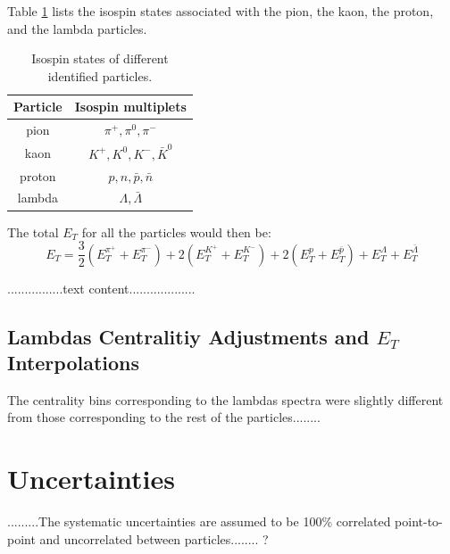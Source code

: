Table \ref{table:isospinStates} lists the isospin states associated with the pion, the kaon, the proton, and the lambda particles.
	\begin{table}[h!]
	\centering
	\begin{tabular}{|c c|}
	\hline
	Particle & Isospin multiplets \\ [0.5ex]
	\hline
	\hline
	pion & $\pi^{+}, \pi^{0}, \pi^{-} $ \\
	kaon & $K^{+}, K^{0}, K^{-}, \bar{K}^{0}$ \\
	proton & $p, n, \bar{p}, \bar{n}$  \\
	lambda & $\Lambda, \bar{\Lambda}$  \\ [1ex]
	\hline
	\end{tabular}
	\caption{Isospin states of different identified particles.}
	\label{table:isospinStates}
	\end{table}
The total $E_{T}$ for all the particles would then be:	
	\begin{equation}\label{eqn:TotET}
	E_{T} = \frac{3}{2}(E_{T}^{\pi^{+}}+E_{T}^{\pi^{-}}) + 2(E_{T}^{K^{+}}+E_{T}^{K^{-}}) + 2(E_{T}^{p}+E_{T}^{\bar{p}}) + E_{T}^{\Lambda} + E_{T}^{\bar{\Lambda}}
	\end{equation}
	
 ................text content...................
 
\subsection{Lambdas Centralitiy Adjustments and $E_{T}$ Interpolations}
The centrality bins corresponding to the lambdas spectra were slightly different from those corresponding to the rest of the particles........
\section{Uncertainties}
.........The systematic uncertainties are assumed to be 100\% correlated point-to-point and uncorrelated between particles........ ?
